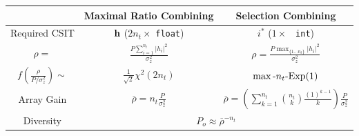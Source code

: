 \documentclass[xcolor=dvipsnames,aspectratio=169]{beamer}
\begin{document}
{\begin{table}
  \begin{tabular}{c|c|c}
   &Maximal Ratio Combining& Selection Combining\\\hline
   Required CSIT & $\mathbf{h}$ ($2n_t\times$ \texttt{\color{KYJade}float}) & $i^*$ ($1\times$ \texttt{\color{KYJade} int})\\
   $\rho=$&$\frac{P\sum_{i=1}^{n_t}|h_i|^2}{\sigma_z^2}$& $\rho=\frac{ P\max_{\{1\dots n_t\}} |h_i|^2}{\sigma_z^2}$\\
   $f(\frac{\rho}{P/\sigma_z^2})\sim$&$\frac{1}{\sqrt{2}}\chi^2(2n_t)$& $\max\textnormal{-}n_t\textnormal{-}\textnormal{Exp}(1)$\\
   Array Gain&$\overline{\rho}=n_t\frac{P}{\sigma_z^2}$& $\overline{\rho}=\left(\sum_{k=1}^{n_t}{n_t \choose k}\frac{(1)^{k-1}}{k}\right)\frac{P}{\sigma_z^2}$\\\hline
   Diversity& \multicolumn{2}{c}{$P_o\approx\overline{\rho}^{-n_t}$}
  \end{tabular}
\end{table}
}
\end{document}
